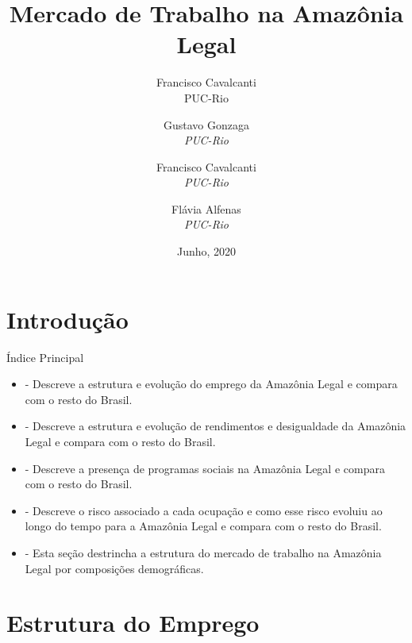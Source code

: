 \documentclass[11pt]{beamer}
\author[Francisco Cavalcanti]{Francisco Cavalcanti\\\footnotesize{PUC-Rio}
}
\author{
Gustavo Gonzaga \\
\textit{PUC-Rio}\\ \vspace{3mm}
\and  
Francisco Cavalcanti\\
\textit{PUC-Rio}\\ \vspace{3mm}
\and   
Flávia  Alfenas\\
\textit{PUC-Rio} 
}
\date{Junho, 2020}
\title{Mercado de Trabalho na Amazônia Legal}
\begin{document}
\begin{frame}
\titlepage
\end{frame}


\section{Introdução}

\begin{frame}[label=indice_principal]{Índice Principal}

\begin{itemize}
\item{
	\hyperlink{_estrutura_emprego}{} - Descreve a estrutura e evolução do emprego da Amazônia Legal e compara com o resto do Brasil.
	}   
		
\item{
	\hyperlink{_estrutura_renda}{} - Descreve a estrutura e evolução de rendimentos e desigualdade da Amazônia Legal e compara com o resto do Brasil.
	}  
	
\item{
	\hyperlink{_programas_sociais}{} - Descreve a presença de programas sociais na Amazônia Legal e compara com o resto do Brasil.
	}  
	
\item{
	\hyperlink{_transicao_ocupacao}{} - Descreve o risco associado a cada ocupação e como esse risco evoluiu ao longo do tempo para a Amazônia Legal e compara com o resto do Brasil.
	}  
	
\item{
	\hyperlink{_composicao_demografica}{} - Esta seção destrincha a estrutura do mercado de trabalho na Amazônia Legal por composições demográficas.
	}  

\end{itemize}

\end{frame}

\section{Estrutura do Emprego}


\end{document}

